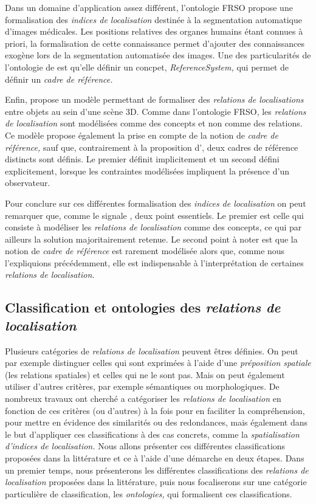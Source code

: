 Dans un domaine d’application assez différent, l'ontologie FRSO
\autocite{Hudelot2008a} propose une formalisation des \emph{indices de
  localisation} destinée à la segmentation automatique d'images
médicales. Les positions relatives des organes humains étant connues à
priori, la formalisation de cette connaissance permet d'ajouter des
connaissances exogène lors de la segmentation automatisée des
images. Une des particularités de l'ontologie de
\textcite{Hudelot2008a} est qu'elle définir un concpet,
\emph{ReferenceSystem,} qui permet de définir un \emph{cadre de
  référence.}

Enfin, \textcite{Trinh2012} propose un modèle permettant de formaliser
des \emph{relations de localisations} entre objets au sein d'une scène
3D. Comme dans l'ontologie FRSO, les \emph{relations de localisation}
sont modélisées comme des concepts et non comme des relations. Ce
modèle propose également la prise en compte de la notion de
\emph{cadre de référence,} sauf que, contrairement à la proposition
d'\textcite{Hudelot2008a}, deux cadres de référence distincts sont
définis. Le premier définit implicitement et un second défini
explicitement, lorsque les contraintes modélisées impliquent la
présence d'un observateur.

Pour conclure sur ces différentes formalisation des \emph{indices de
  localisation} on peut remarquer que, comme le signale
\textcite{Duchene2019}, deux point essentiels. Le premier est celle
qui consiste à modéliser les \emph{relations de localisation} comme
des concepts, ce qui par ailleurs la solution majoritairement
retenue. Le second point à noter est que la notion de \emph{cadre de
  référence} est rarement modélisée alors que, comme nous
l'expliquions précédemment, elle est indispensable à l'interprétation
de certaines \emph{relations de localisation.}

\subsection{Classification et ontologies des \emph{relations de
    localisation}}

Plusieurs catégories de \emph{relations de localisation} peuvent êtres
définies. On peut par exemple distinguer celles qui sont exprimées à
l'aide d'une \emph{préposition spatiale} (\ie les relations spatiales)
et celles qui ne le sont pas. Mais on peut également utiliser d'autres
critères, par exemple sémantiques ou morphologiques. De nombreux
travaux ont cherché a catégoriser les \emph{relations de localisation}
en fonction de ces critères (ou d'autres) à la fois pour en faciliter
la compréhension, pour mettre en évidence des similarités ou des
redondances, mais également dans le but d'appliquer ces
classifications à des cas concrets, comme la \emph{spatialisation
  d'indices de localisation.} Nous allons présenter ces différentes
classifications proposées dans la littérature et ce à l'aide d'une
démarche en deux étapes. Dans un premier temps, nous présenterons les
différentes classifications des \emph{relations de localisation}
proposées dans la littérature, puis nous focaliserons sur une
catégorie particulière de classification, les \emph{ontologies,} qui
formalisent ces classifications.

